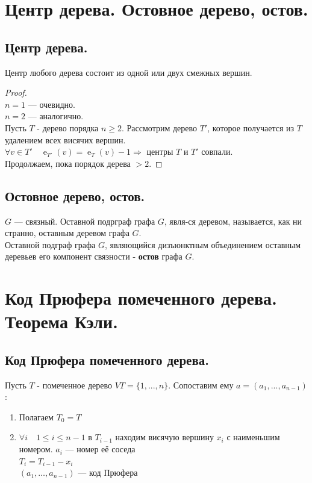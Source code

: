 \documentclass[12pt]{article}
\begin{document}
\section{Центр дерева. Остовное дерево, остов. }
	\subsection{Центр дерева.}
		Центр любого дерева состоит из одной или двух смежных вершин.
		\begin{proof}\hfil\\
			$n=1$ — очевидно.\\
			$n=2$ — аналогично.\\
			Пусть $T$ - дерево порядка $n\ge2$. Рассмотрим дерево $T'$, которое получается из $T$ удалением всех висячих вершин.\\
			$\forall v \in T' \quad  \operatorname{e}_{T'}(v)= \operatorname{e}_T(v)-1  \Rightarrow$ центры $T$ и $T'$ совпали.\\
			Продолжаем, пока порядок дерева $>2$.
		\end{proof}
	\subsection{Остовное дерево, остов.}
		$G$ — связный. Оставной подрграф графа $G$, явля-ся деревом, называется, как ни странно, оставным деревом графа $G$.\\
		Оставной подграф графа $G$, являющийся дизъюнктным объединением оставным деревьев его компонент связности - \textbf{остов} графа $G$.

\section{Код Прюфера помеченного дерева. Теорема Кэли.}
	\subsection{Код Прюфера помеченного дерева.}
		Пусть $T$ - помеченное дерево $VT=\{1,...,n\}$. Сопоставим ему $a=(a_1,...,a_{n-1})$:
		\begin{enumerate}
			\item Полагаем $T_0 = T$\\
			\item $\forall i \quad 1 \leqslant i \leqslant n-1$ в $T_{i-1}$ находим висячую вершину $x_i$ с наименьшим номером. $a_i$ — номер её соседа\\
			$T_i = T_{i-1} - x_i$\\
			$(a_1,\dotsc,a_{n-1})$ — код Прюфера\\
		\end{enumerate}
\end{document}
